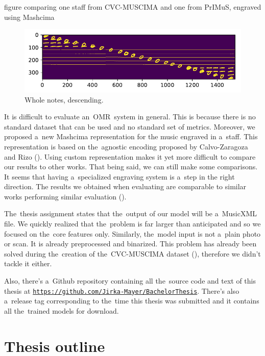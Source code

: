 \begin{code}
figure comparing one staff from CVC-MUSCIMA
and one from PrIMuS,
engraved using Mashcima
\end{code}

\begin{figure}[h]\centering
\includegraphics[width=140mm]{../img/test_1}
\caption{Whole notes, descending.}
\label{fig:WholeNotesDescending}
\end{figure}

It is difficult to evaluate an~OMR~system in general. This is because there is no standard dataset that can be used and no standard set of metrics. Moreover, we proposed a~new Mashcima representation for the music engraved in a~staff. This representation is based on the~agnostic encoding proposed by Calvo-Zaragoza and Rizo (\cite{Primus}). Using custom representation makes it yet more difficult to compare our results to other works. That being said, we can still make some comparisons. It seems that having a~specialized engraving system is a~step in the right direction. The results we obtained when evaluating are comparable to similar works performing similar evaluation (\cite{HmrBaseline}).

The~thesis assignment states that the~output of our model will be a~MusicXML file. We quickly realized that the~problem is far larger than anticipated and so we focused on the~core features only. Similarly, the~model input is not a~plain photo or scan. It is already preprocessed and binarized. This problem has already been solved during the~creation of the~CVC-MUSCIMA dataset (\cite{CvcMuscima}), therefore we didn't tackle it either.

Also, there's a~Github repository containing all the~source code and text of this thesis at \href{https://github.com/Jirka-Mayer/BachelorThesis}{\texttt{https://github.com/Jirka-Mayer/BachelorThesis}}. There's also a~release tag corresponding to the~time this thesis was submitted and it contains all the~trained models for download.

\section*{Thesis outline}

